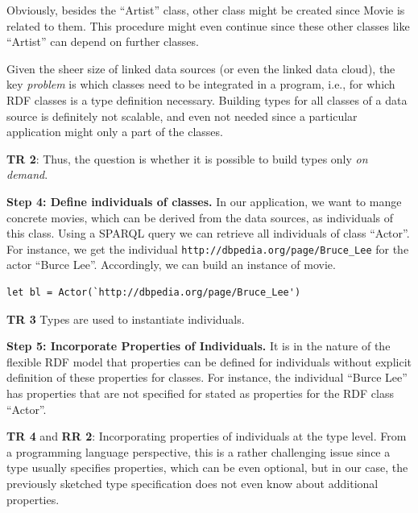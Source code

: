 \documentclass{llncs} %
\newcommand{\rr}[1]{\textbf{RR #1}}
\newcommand{\tr}[1]{\textbf{TR #1}}
\begin{document}
Obviously, besides the ``Artist'' class, other class might be created since Movie is related to them. This procedure might even continue since
these other classes like ``Artist'' can depend on further classes.

Given the sheer size of linked data sources (or even the linked data cloud), the key \emph{problem} is which classes need to be 
integrated in a program, i.e., for which RDF classes is a type definition necessary. Building types for all classes of a
data source is definitely not scalable, and even not needed since a particular application 
might only a part of the classes.

\tr{2}: Thus, the question is whether it is possible to build types only \emph{on demand}.

\vspace{0.8em}
\noindent
\textbf{Step 4: Define individuals of classes.}
In our application, we want to mange concrete movies, which can be derived from the data sources,
as individuals of this class. Using a SPARQL query we can retrieve all individuals of class ``Actor''.
For instance, we get the individual \texttt{http://dbpedia.org/page/Bruce\_Lee} for the actor ``Burce Lee''.
Accordingly, we can build an instance of movie.

\begin{lstlisting}[style=code, caption={Individual of  ``Actor'' }, label={lst:skyfall}]
let bl = Actor(`http://dbpedia.org/page/Bruce_Lee')
\end{lstlisting}

\tr{3} Types are used to instantiate individuals. 

\vspace{0.8em}
\noindent
\textbf{Step 5: Incorporate Properties of Individuals.}
It is in the nature of the flexible RDF model that properties can be defined for individuals 
without explicit definition of these properties for classes. For instance, the individual
``Burce Lee'' has properties that are not specified for stated as properties for the RDF class ``Actor''.

\tr{4} and \rr{2}: Incorporating properties of individuals at the type level. From a programming language perspective,
this is a rather challenging issue since a type usually specifies properties, which can be even optional,
but in our case, the previously sketched type specification does not even know about additional properties.
\end{document}
